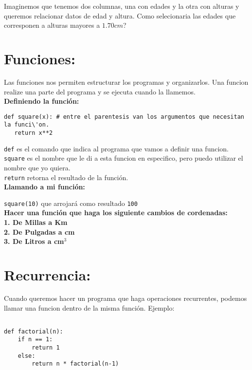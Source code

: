 \documentclass[12pt]{article}
\begin{document}
Imaginemos que tenemos dos columnas, una con edades y la otra con alturas y queremos relacionar datos de edad y altura. Como selecionaria las edades que corresponen a alturas mayores a $1.70cm$?

\section{Funciones:}

Las funciones nos permiten estructurar los programas y organizarlos. Una funcion realize una parte 
del programa y se ejecuta cuando la llamemos.\\

{\bf Definiendo la funci\'on:}\\

\begin{verbatim}
def square(x): # entre el parentesis van los argumentos que necesitan la funci\'on.
   return x**2
\end{verbatim}

\verb+def+ es el comando que indica al programa que vamos a definir una funcion.\\
\verb+square+ es el nombre que le di a esta funcion en especifico, pero puedo utilizar el nombre que yo quiera.\\
\verb+return+ retorna el resultado de la funci\'on.\\

{\bf Llamando a mi funci\'on:}

\verb+square(10)+ que arrojar\'a como resultado \verb+100+\\

{\bf{Hacer una funci\'on que haga los siguiente cambios de cordenadas:\\
1. De Millas a Km\\
2. De Pulgadas a cm\\ 
3. De Litros a cm$^{3}$\\}}

\section{Recurrencia:}

Cuando queremos hacer un programa que haga operaciones recurrentes, podemos llamar
una funcion dentro de la misma funci\'on. Ejemplo:\\

\begin{verbatim}

def factorial(n):
    if n == 1:
        return 1
    else:
        return n * factorial(n-1)

\end{verbatim}
\end{document}
